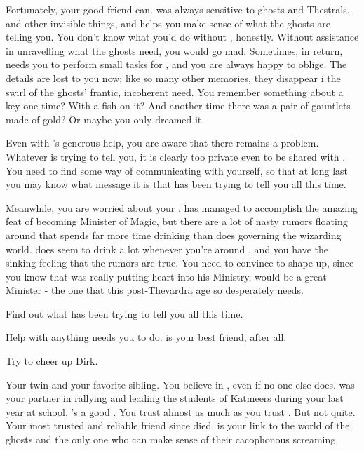 \documentclass[char]{Katmeers}
\begin{document}
Fortunately, your good friend \cCrabbe{} can. \cCrabbe{} was always sensitive to ghosts and Thestrals, and other invisible things, and \cCrabbe{\they} helps you make sense of what the ghosts are telling you. You don't know what you'd do without \cCrabbe{\them}, honestly. Without \cCrabbe{\their} assistance in unravelling what the ghosts need, you would go mad. Sometimes, in return, \cCrabbe{\they} needs you to perform small tasks for \cCrabbe{\them}, and you are always happy to oblige. The details are lost to you now; like so many other memories, they disappear i the swirl of the ghosts' frantic, incoherent need. You remember something about a key one time? With a fish on it? And another time there was a pair of gauntlets made of gold? Or maybe you only dreamed it.

Even with \cCrabbe{}'s generous help, you are aware that there remains a problem. Whatever \cHarry{} is trying to tell you, it is clearly too private even to be shared with \cCrabbe{}. You need to find some way of communicating with \cHarry{\them} yourself, so that at long last you may know what message it is that \cHarry{\they} has been trying to tell you all this time.

Meanwhile, you are worried about your \cRon{\sibling} \cRon{}. \cRon{\They} has managed to accomplish the amazing feat of becoming Minister of Magic, but there are a lot of nasty rumors floating around that \cRon{\they} spends far more time drinking than \cRon{\they} does governing the wizarding world. \cRon{\They} does seem to drink a lot whenever you're around \cRon{\them}, and you have the sinking feeling that the rumors are true. You need to convince \cRon{\them} to shape up, since you know that \cRon{\they} was really putting \cRon{\their} heart into his Ministry, \cRon{\they} would be a great Minister - the one that this post-Thevardra age so desperately needs.


\begin{itemz}[Goals]
	\item Find out what \cHarry{} has been trying to tell you all this time.
	\item Help \cCrabbe{} with anything \cCrabbe{\they} needs you to do. \cCrabbe{\They} is your best friend, after all.
	\item Try to cheer up Dirk.
\end{itemz}

\begin{itemz}[Notes]
	\item 
\end{itemz}

\begin{contacts}
	\contact{\cRon{}} Your twin \cRon{\sibling} and your favorite sibling. You believe in \cRon{\them}, even if no one else does.
	\contact{\cNeville{}} \cNeville{} was your partner in rallying and leading the students of Katmeers during your last year at school. \cNeville{\They}'s a good \cNeville{\human}. You trust \cNeville{\them} almost as much as you trust \cCrabbe{}. But not quite.
	\contact{\cCrabbe{}} Your most trusted and reliable friend since \cHarry{} died. \cCrabbe{} is your link to the world of the ghosts and the only one who can make sense of their cacophonous screaming.
\end{contacts}
\end{document}
